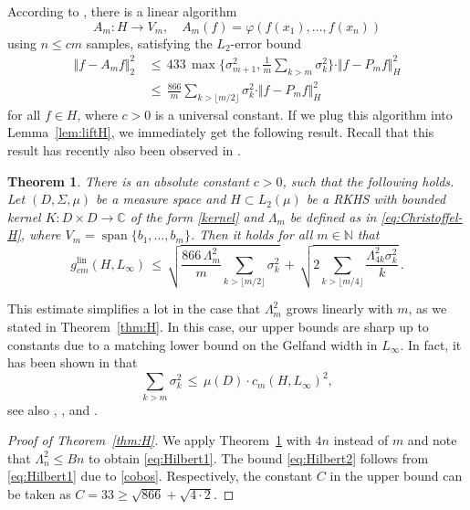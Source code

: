 \documentclass[a4paper,12pt]{amsart}
\newtheorem{theorem}{Theorem}
\theoremstyle{definition}
\theoremstyle{remark}
\newcommand{\lin}{\ensuremath{\mathrm{lin}}}
\begin{document}
 
According to \cite[Thm.~23]{DKU}, 
there is a linear algorithm 
\begin{equation*}%
A_m\colon H \to V_m, 
\quad A_m(f) = \varphi(f(x_1),\hdots,f(x_{n}))
\end{equation*}
using $n\le c m$ samples, 
satisfying the $L_2$-error bound
\begin{align}\label{eq:DKU}
\Vert f - A_m f \Vert_2^2 \,&\le\, 
433 \,\max\bigg\{\sigma_{m+1}^2, \frac{1}{m} \sum_{k  > m } \sigma_k^2\bigg\}\cdot  \Vert f - P_m f \Vert_H^2\\ \nonumber
&\le\, \frac{866}{m} \sum_{k  > \lfloor m/2 \rfloor } \sigma_k^2 \cdot  \Vert f - P_m f \Vert_H^2
\end{align}
for all $f\in H$, where $c>0$ is a universal constant.
If we plug this algorithm into Lemma~\ref{lem:liftH},
we immediately get the following result.
Recall that this result has recently also been observed in \cite{GW23}.


 
 \begin{theorem}\label{thm:H2}
There is an
absolute constant
$c>0$,
such that the following holds.
Let $(D,\Sigma,\mu)$ be a measure space
and
$H\subset L_2(\mu)$ be a 
RKHS with bounded kernel $K\colon D\times D\to \mathbb{C}$ of the form \eqref{kernel} and $\Lambda_m$ be defined {as in \eqref{eq:Christoffel-H}},
where $V_m=\operatorname{span}\{b_1, \dots, b_m\}$.
Then it holds for all $m\in\mathbb{N}$ that
\[
 g^\lin_{cm}( H, L_{\infty}) \,\le\,
 \sqrt{\frac{866 \,\Lambda_m^2}{m}\sum_{k > \lfloor m/2 \rfloor}\sigma_k^2} \,+\,
 \sqrt{2 \sum_{k > \lfloor m/4 \rfloor} \frac{\Lambda_{4k}^2\sigma_k^2}{k}} \, .
\]
\end{theorem}
 
This estimate simplifies a lot
in the case that $\Lambda_m^2$ grows linearly with $m$,
as we stated in Theorem~\ref{thm:H}.
In this case, our upper bounds are sharp up to constants
due to a matching lower bound on the Gelfand width in $L_\infty$. 
In fact, it has been shown
in \cite[Thm.~3]{Osipenko_Parfenov1995}
that
\begin{equation}\label{cobos}
	\sum_{k>m} \sigma_k^2  \,\leq\,
	\mu(D) \cdot c_m(H , L_{\infty})^2, 
\end{equation}
see also
\cite[Lemma~3.3]{CKS}, \cite[Proposition~2.7]{Kunsch2018}, and \cite[Thm.~4]{KWW08}.


\begin{proof}[Proof of Theorem~\ref{thm:H}]
We apply Theorem~\ref{thm:H2} with $4n$ instead of $m$ 
{and note that $\Lambda_n^2 \le B n$ to obtain \eqref{eq:Hilbert1}.
The bound \eqref{eq:Hilbert2} follows from \eqref{eq:Hilbert1} due to \eqref{cobos}.}
{Respectively, the constant $C$ in the upper bound can be taken as $C=33\geq \sqrt{866}+\sqrt{4\cdot 2}$.}
\end{proof}
\end{document}
